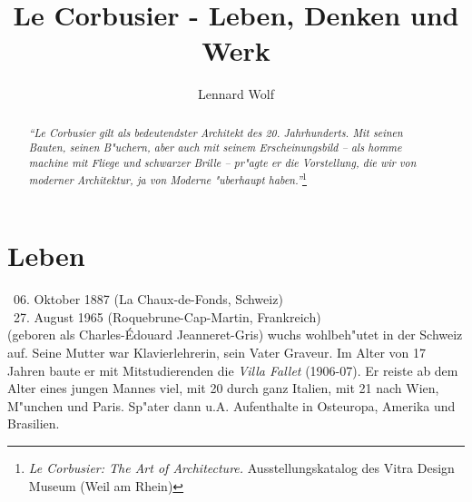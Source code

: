 \documentclass[a4paper]{tufte-handout}
\title{Le Corbusier - Leben, Denken und Werk}%
\author[Lennard Wolf]{Lennard Wolf}
\date{ } %
\begin{document}
\maketitle%


\begin{abstract}
\noindent
\emph{"`Le Corbusier gilt als bedeutendster Architekt des 20. Jahrhunderts. Mit seinen Bauten, seinen B"uchern, aber auch mit seinem Erscheinungsbild -- als \emph{homme machine} mit Fliege und schwarzer Brille -- pr"agte er die Vorstellung, die wir von moderner Architektur, ja von Moderne "uberhaupt haben."'}\footnote{\emph{Le Corbusier: The Art of Architecture.} Ausstellungskatalog des Vitra Design Museum (Weil am Rhein)}
\end{abstract}


\section{Leben}\label{sec:leben}

\textasteriskcentered ~06. Oktober 1887 (La Chaux-de-Fonds, Schweiz)\\
\noindent \textdagger~27. August 1965 (Roquebrune-Cap-Martin, Frankreich)\\

 (geboren als Charles-\'Edouard Jeanneret-Gris) wuchs wohlbeh"utet in der Schweiz auf. Seine Mutter war Klavierlehrerin, sein Vater Graveur. Im Alter von 17 Jahren baute er mit Mitstudierenden die \emph{Villa Fallet} (1906-07). Er reiste ab dem Alter eines jungen Mannes viel, mit 20 durch ganz Italien, mit 21 nach Wien, M"unchen und Paris. Sp"ater dann u.A. Aufenthalte in Osteuropa, Amerika und Brasilien.
\end{document}
